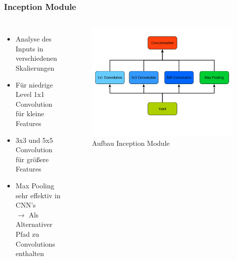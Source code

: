 \documentclass{beamer}
\begin{document}
\begin{frame}
	\frametitle{Inception Module}
	\begin{columns}[c]
		\begin{itemize}
			\item Analyse des Inputs in verschiedenen Skalierungen
			\item Für niedrige Level 1x1 Convolution für kleine Features
			\item 3x3 und 5x5 Convolution für größere Features
			\item Max Pooling sehr effektiv in CNN's \\ 
			$\rightarrow$ Als Alternativer Pfad zu Convolutions enthalten
		\end{itemize}
		
		\begin{figure}
			\includegraphics[width=\linewidth]{images/inception_naive_graph.png}
			\caption{Aufbau Inception Module}
			\label{fig:naive_inception}
		\end{figure}
	\end{columns}
\end{frame}
\end{document}
